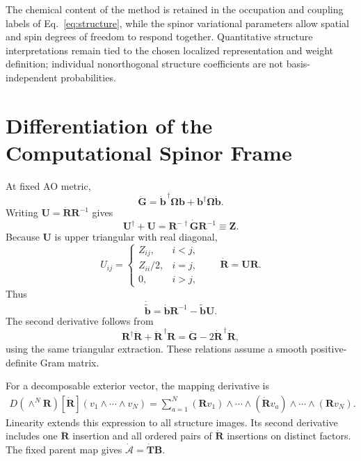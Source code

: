 \documentclass[12pt]{article}
\begin{document}
The chemical content of the method is retained in the occupation and coupling labels of Eq.~\eqref{eq:structure}, while the spinor variational parameters allow spatial and spin degrees of freedom to respond together. Quantitative structure interpretations remain tied to the chosen localized representation and weight definition; individual nonorthogonal structure coefficients are not basis-independent probabilities.

\appendix
\section{Differentiation of the Computational Spinor Frame}

At fixed AO metric,
\begin{equation}
 \dot{\mathbf G}=\dot{\mathbf b}^{\,\dagger}\boldsymbol\Omega\mathbf b
                 +\mathbf b^\dagger\boldsymbol\Omega\dot{\mathbf b}.
 \label{eq:gramderivative}
\end{equation}
Writing \(\mathbf U=\dot{\mathbf R}\mathbf R^{-1}\) gives
\begin{equation}
 \mathbf U^\dagger+\mathbf U
 =\mathbf R^{-\dagger}\dot{\mathbf G}\mathbf R^{-1}
 \equiv\mathbf Z.
 \label{eq:choleskyderivative}
\end{equation}
Because \(\mathbf U\) is upper triangular with real diagonal,
\begin{equation}
 U_{ij}=\begin{cases}
 Z_{ij},&i<j,\\Z_{ii}/2,&i=j,\\0,&i>j,
 \end{cases}
 \qquad \dot{\mathbf R}=\mathbf U\mathbf R.
 \label{eq:triangularderivative}
\end{equation}
Thus
\begin{equation}
 \dot{\widetilde{\mathbf b}}=
 \dot{\mathbf b}\mathbf R^{-1}-\widetilde{\mathbf b}\mathbf U.
 \label{eq:orthframe_derivative}
\end{equation}
The second derivative follows from
\begin{equation}
 \mathbf R^\dagger\ddot{\mathbf R}
 +\ddot{\mathbf R}^{\,\dagger}\mathbf R
 =\ddot{\mathbf G}-2\dot{\mathbf R}^{\,\dagger}\dot{\mathbf R},
 \label{eq:secondcholesky}
\end{equation}
using the same triangular extraction. These relations assume a smooth positive-definite Gram matrix.

For a decomposable exterior vector, the mapping derivative is
\begin{equation}
 \begin{aligned}
 D(\wedge^N\mathbf R)[\dot{\mathbf R}]
 (v_1\wedge\cdots\wedge v_N)
 =\sum_{a=1}^{N}
 (\mathbf Rv_1)\wedge\cdots\wedge
 (\dot{\mathbf R}v_a)\wedge\cdots\wedge(\mathbf Rv_N).
 \end{aligned}
 \label{eq:exteriorderivative}
\end{equation}
Linearity extends this expression to all structure images. Its second derivative includes one \(\ddot{\mathbf R}\) insertion and all ordered pairs of \(\dot{\mathbf R}\) insertions on distinct factors. The fixed parent map gives
\(\dot{\boldsymbol{\mathcal A}}=\dot{\mathbf T}\mathbf B\).
\end{document}
